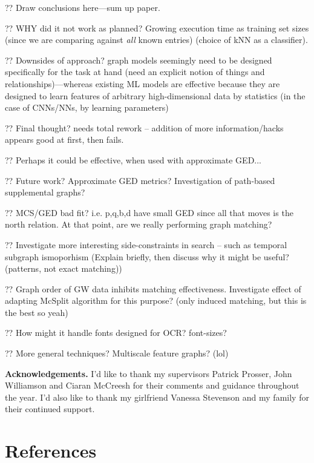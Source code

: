 \documentclass{mpaper}
\begin{document}
?? Draw conclusions here---sum up paper.

?? WHY did it not work as planned? Growing execution time as training set sizes (since we are comparing against \emph{all} known entries) (choice of kNN as a classifier).

?? Downsides of approach? graph models seemingly need to be designed specifically for the task at hand (need an explicit notion of things and relationships)---whereas existing ML models are effective because they are designed to learn features of arbitrary high-dimensional data by statistics (in the case of CNNs/NNs, by learning parameters)

?? Final thought? needs total rework -- addition of more information/hacks appears good at first, then fails.

?? Perhaps it could be effective, when used with approximate GED... \cite{GED-Approx}

?? Future work? Approximate GED metrics? Investigation of path-based supplemental graphs?

?? MCS/GED bad fit? i.e. p,q,b,d have small GED since all that moves is the north relation. At that point, are we really performing graph matching?

?? Investigate more interesting side-constraints in search -- such as temporal subgraph ismoporhism \cite{TSIP-Long} (Explain briefly, then discuss why it might be useful? (patterns, not exact matching))

?? Graph order of GW data inhibits matching effectiveness. Investigate effect of adapting McSplit algorithm for this purpose? (only induced matching, but this is the best so yeah)

?? How might it handle fonts designed for OCR? font-sizes?

?? More general techniques? Multiscale feature graphs? (lol)

\noindent
{\bf Acknowledgements.}
I'd like to thank my supervisors Patrick Prosser, John Williamson and Ciaran McCreesh for their comments and guidance throughout the year.
I'd also like to thank my girlfriend Vanessa Stevenson and my family for their continued support.

\section{References}
\printbibliography[heading=none]

\vspace{1em}
\end{document}
